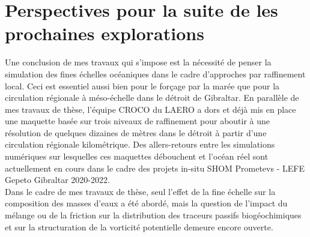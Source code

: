 \color{blue}
\section{Perspectives pour la suite de les prochaines explorations}
Une conclusion de mes travaux qui s'impose est la nécessité de penser la simulation des fines échelles océaniques dans le cadre d'approches par raffinement local. Ceci est essentiel aussi bien pour le forçage par la marée que pour la circulation régionale à méso-échelle dans le détroit de Gibraltar. En parallèle de mes travaux de thèse, l'équipe CROCO du LAERO a dors et déjà mis en place une maquette basée sur trois niveaux de raffinement pour aboutir à une résolution de quelques dizaines de mètres dans le détroit à partir d'une circulation régionale kilométrique. Des allers-retours entre les simulations numériques sur lesquelles ces maquettes débouchent et l'océan réel sont actuellement en cours dans le cadre des projets in-situ SHOM Prometevs - LEFE Gepeto Gibraltar 2020-2022.\\
\color{blue}
Dans le cadre de mes travaux de thèse, seul l'effet de la fine échelle sur la composition des masses d'eaux a été abordé, mais la question de l'impact du mélange ou de la friction sur la distribution des traceurs passifs biogéochimiques \citep{penney_2020} et sur la structuration de la vorticité potentielle \cite{morel_potential_2019} demeure encore ouverte.\\

